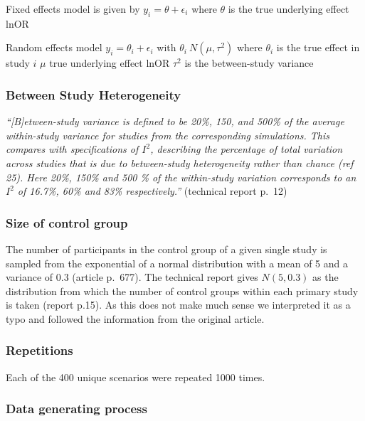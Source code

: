 \documentclass[
  english,
  doc,floatsintext,draftall]{apa6}
\begin{document}
Fixed effects model is given by
\(y_i=\theta + \epsilon_i\)
where \(\theta\) is the true underlying effect lnOR

Random effects model
\(y_i = \theta_i + \epsilon_i\)
with \(\theta_i~ N(\mu,\tau^2)\)
where \(\theta_i\) is the true effect in study \(i\)
\(\mu\) true underlying effect lnOR
\(\tau^2\) is the between-study variance

\hypertarget{between-study-heterogeneity}{%
\subsubsection{Between Study Heterogeneity}\label{between-study-heterogeneity}}

\emph{\enquote{{[}B{]}etween-study variance is defined to be 20\%, 150, and 500\% of the average within-study variance for studies from the corresponding simulations.
This compares with specifications of \(I^2\), describing the percentage of total variation across studies that is due to between-study heterogeneity rather than chance (ref 25). Here 20\%, 150\% and 500 \% of the within-study variation corresponds to an \(I^2\) of 16.7\%, 60\% and 83\% respectively.}} (technical report p.~12)

\hypertarget{size-of-control-group}{%
\subsubsection{Size of control group}\label{size-of-control-group}}

The number of participants in the control group of a given single study is sampled from the exponential of a normal distribution with a mean of 5 and a variance of 0.3 (article p.~677).
The technical report gives \(N(5, 0.3)\) as the distribution from which the number of control groups within each primary study is taken (report p.15). As this does not make much sense we interpreted it as a typo and followed the information from the original article.

\hypertarget{repetitions}{%
\subsubsection{Repetitions}\label{repetitions}}

Each of the 400 unique scenarios were repeated 1000 times.

\hypertarget{data-generating-process}{%
\subsubsection{Data generating process}\label{data-generating-process}}
\end{document}
